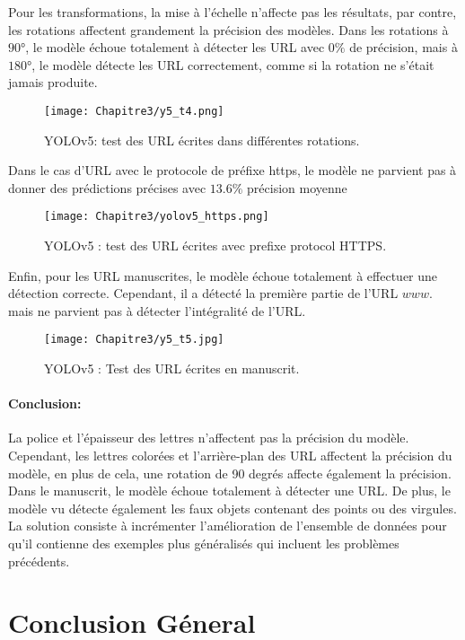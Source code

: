           Pour les transformations, la mise à l'échelle n'affecte pas les résultats, par contre, les rotations affectent grandement la précision des modèles. Dans les rotations à $90 °$, le modèle échoue totalement à détecter les URL avec $0\%$ de précision, mais à $180 °$, le modèle détecte les URL correctement, comme si la rotation ne s'était jamais produite.
          \begin{figure}[H]
                    \centering
                    \texttt{[image: Chapitre3/y5\_t4.png]}
                    \caption{YOLOv5: test des URL écrites dans différentes rotations.}
                    \label{y5_t4}
                    \end{figure}
               
          Dans le cas d'URL avec le protocole de préfixe https, le modèle ne parvient pas à donner des prédictions précises avec $13.6\%$ précision moyenne
          \begin{figure}[H]
                    \centering
                    \texttt{[image: Chapitre3/yolov5\_https.png]}
                    \caption{YOLOv5 : test des URL écrites avec prefixe protocol HTTPS.}
                    \label{y5_https}
                    \end{figure}
               

          Enfin, pour les URL manuscrites, le modèle échoue totalement à effectuer une détection correcte. Cependant, il a détecté la première partie de l'URL $www.$ mais ne parvient pas à détecter l'intégralité de l'URL.
          \begin{figure}[H]
                    \centering
                    \texttt{[image: Chapitre3/y5\_t5.jpg]}
                    \caption{YOLOv5 : Test des URL écrites en manuscrit.}
                    \label{y5_t5}
                    \end{figure}

          \paragraph{Conclusion:} La police et l'épaisseur des lettres n'affectent pas la précision du modèle. Cependant, les lettres colorées et l'arrière-plan des URL affectent la précision du modèle, en plus de cela, une rotation de 90 degrés affecte également la précision. Dans le manuscrit, le modèle échoue totalement à détecter une URL. De plus, le modèle vu détecte également les faux objets contenant des points ou des virgules.
          La solution consiste à incrémenter l'amélioration de l'ensemble de données pour qu'il contienne des exemples plus généralisés qui incluent les problèmes précédents.

\section{Conclusion Géneral}